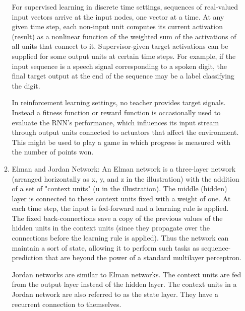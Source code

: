 \documentclass[a4paper, 12pt]{article}
\begin{document}
\begin{enumerate}
\begin{enumerate}
For supervised learning in discrete time settings, sequences of real-valued input vectors arrive at the input nodes, one vector at a time. At any given time step, each non-input unit computes its current activation (result) as a nonlinear function of the weighted sum of the activations of all units that connect to it. Supervisor-given target activations can be supplied for some output units at certain time steps. For example, if the input sequence is a speech signal corresponding to a spoken digit, the final target output at the end of the sequence may be a label classifying the digit.

In reinforcement learning settings, no teacher provides target signals. Instead a fitness function or reward function is occasionally used to evaluate the RNN's performance, which influences its input stream through output units connected to actuators that affect the environment. This might be used to play a game in which progress is measured with the number of points won.
\item Elman and Jordan Network: An Elman network is a three-layer network (arranged horizontally as x, y, and z in the illustration) with the addition of a set of "context units" (u in the illustration). The middle (hidden) layer is connected to these context units fixed with a weight of one. At each time step, the input is fed-forward and a learning rule is applied. The fixed back-connections save a copy of the previous values of the hidden units in the context units (since they propagate over the connections before the learning rule is applied). Thus the network can maintain a sort of state, allowing it to perform such tasks as sequence-prediction that are beyond the power of a standard multilayer perceptron.

Jordan networks are similar to Elman networks. The context units are fed from the output layer instead of the hidden layer. The context units in a Jordan network are also referred to as the state layer. They have a recurrent connection to themselves.

\end{enumerate}
\end{enumerate}
 
\end{document}
